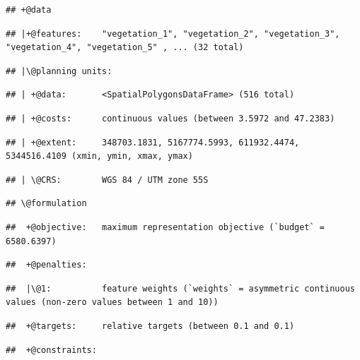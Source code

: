 \documentclass[
  12pt,
]{book}
\begin{document}
\begin{verbatim}
## +@data
\end{verbatim}

\begin{verbatim}
## |+@features:    "vegetation_1", "vegetation_2", "vegetation_3", "vegetation_4", "vegetation_5" , ... (32 total)
\end{verbatim}

\begin{verbatim}
## |\@planning units:
\end{verbatim}

\begin{verbatim}
## | +@data:       <SpatialPolygonsDataFrame> (516 total)
\end{verbatim}

\begin{verbatim}
## | +@costs:      continuous values (between 3.5972 and 47.2383)
\end{verbatim}

\begin{verbatim}
## | +@extent:     348703.1831, 5167774.5993, 611932.4474, 5344516.4109 (xmin, ymin, xmax, ymax)
\end{verbatim}

\begin{verbatim}
## | \@CRS:        WGS 84 / UTM zone 55S
\end{verbatim}

\begin{verbatim}
## \@formulation
\end{verbatim}

\begin{verbatim}
##  +@objective:   maximum representation objective (`budget` = 6580.6397)
\end{verbatim}

\begin{verbatim}
##  +@penalties:
\end{verbatim}

\begin{verbatim}
##  |\@1:          feature weights (`weights` = asymmetric continuous values (non-zero values between 1 and 10))
\end{verbatim}

\begin{verbatim}
##  +@targets:     relative targets (between 0.1 and 0.1)
\end{verbatim}

\begin{verbatim}
##  +@constraints:
\end{verbatim}
\end{document}
